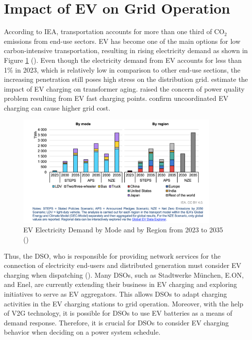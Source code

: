 \section{Impact of \gls{EV} on Grid Operation}
According to \gls{IEA}, transportation accounts for more than one third of $\text{CO}_{2}$ emissions from end-use sectors. \gls{EV} has become one of the main options for low carbon-intensive transportation, resulting in rising electricity demand as shown in Figure \ref{fig:EV_Demand} (\cite{ev2024outlook}). Even though the electricity demand from \gls{EV} accounts for less than 1\% in 2023, which is relatively low in comparison to other end-use sections, the increasing penetration still poses high stress on the distribution grid. \cite{hilshey2012estimating} estimate the impact of \gls{EV} charging on transformer aging. \cite{wang2021grid} raised the concern of power quality problem resulting from \gls{EV} fast charging points. \cite{wangsness2021impact} confirm uncoordinated \gls{EV} charging can cause higher grid cost. 
\begin{figure}[h!]
\begin{center}
\includegraphics[width=0.9\textwidth]{LaTeX_Vorlagen_Studienarbeiten/images/EV Electricity Demand.png}
\caption{\gls{EV} Electricity Demand by Mode and by Region from 2023 to 2035 (\cite{ev2024outlook})}
\label{fig:EV_Demand}
\end{center}
\end{figure}
Thus, the \gls{DSO}, who is responsible for providing network services for the connection of electricity end-users and distributed generation must consider \gls{EV} charging when dispatching (\cite{eudirective2009}). Many \gls{DSO}s, such as Stadtwerke München, E.ON, and Enel, are currently extending their business in \gls{EV} charging and exploring initiatives to serve as \gls{EV} aggregators. This allows \gls{DSO}s to adapt charging activities in the \gls{EV} charging stations to grid operation. Moreover, with the help of \gls{V2G} technology, it is possible for \gls{DSO}s to use \gls{EV} batteries as a means of demand response. Therefore, it is crucial for \gls{DSO}s to consider \gls{EV} charging behavior when deciding on a power system schedule.%

